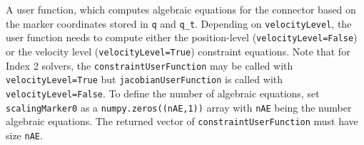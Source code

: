    
    A user function, which computes algebraic equations for the connector based on the marker coordinates stored in \texttt{q} and \texttt{q\_t}.
    Depending on \texttt{velocityLevel}, the user function needs to compute either the position-level (\texttt{velocityLevel=False}) or
    the velocity level (\texttt{velocityLevel=True}) constraint equations.
    Note that for Index 2 solvers, the \texttt{constraintUserFunction} may be called with \texttt{velocityLevel=True} but \texttt{jacobianUserFunction} 
    is called with \texttt{velocityLevel=False}.
    To define the number of algebraic equations, set \texttt{scalingMarker0} as a \texttt{numpy.zeros((nAE,1))} array with \texttt{nAE} being the number algebraic equations. 
    The returned vector of \texttt{constraintUserFunction} must have size \texttt{nAE}.
    
